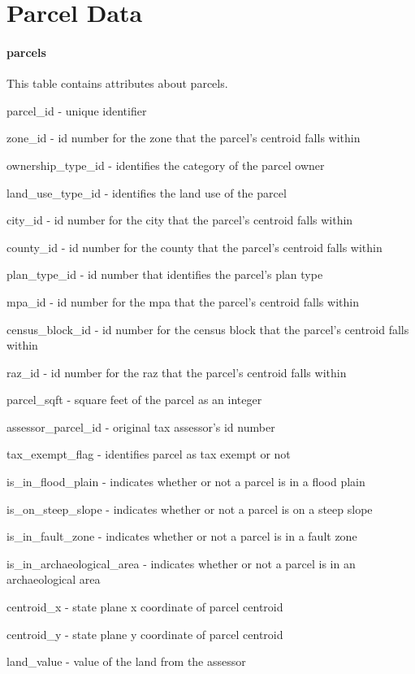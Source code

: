 \chapter{Parcel Data}

\subsubsection{parcels} 
This table contains attributes about parcels.

\begin{description}
\item parcel\_id - unique identifier
\item zone\_id - id number for the zone that the parcel's centroid falls within
\item ownership\_type\_id - identifies the category of the parcel owner
\item land\_use\_type\_id - identifies the land use of the parcel
\item city\_id - id number for the city that the parcel's centroid falls within
\item county\_id - id number for the county that the parcel's centroid falls within
\item plan\_type\_id - id number that identifies the parcel's plan type
\item mpa\_id - id number for the mpa that the parcel's centroid falls within
\item census\_block\_id - id number for the census block that the parcel's centroid falls within
\item raz\_id - id number for the raz that the parcel's centroid falls within
\item parcel\_sqft - square feet of the parcel as an integer
\item assessor\_parcel\_id - original tax assessor's id number
\item tax\_exempt\_flag - identifies parcel as tax exempt or not
\item is\_in\_flood\_plain - indicates whether or not a parcel is in a flood plain
\item is\_on\_steep\_slope - indicates whether or not a parcel is on a steep slope
\item is\_in\_fault\_zone - indicates whether or not a parcel is in a fault zone
\item is\_in\_archaeological\_area - indicates whether or not a parcel is in an archaeological area
\item centroid\_x - state plane x coordinate of parcel centroid
\item centroid\_y - state plane y coordinate of parcel centroid
\item land\_value - value of the land from the assessor 
\end{description}


